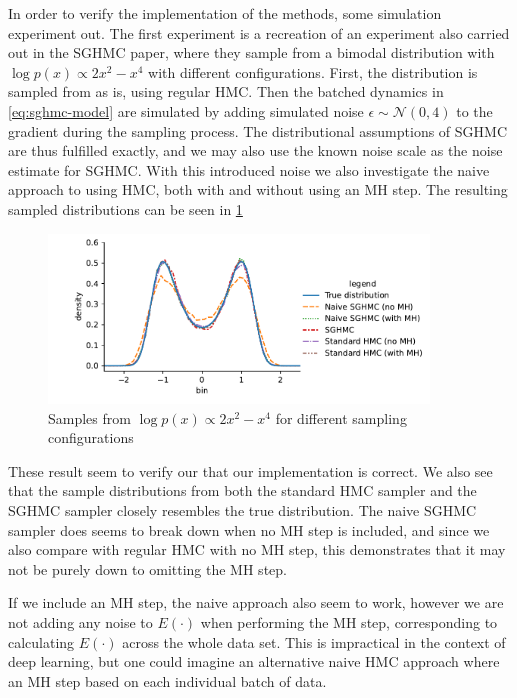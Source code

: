 In order to verify the implementation of the methods, some simulation experiment out. 
The first experiment is a recreation of an experiment also carried out in the SGHMC paper, where they sample from a bimodal distribution with $\log p(x) \propto 2 x^2 - x^ 4$ with different configurations. 
First, the distribution is sampled from as is, using regular HMC.
Then the batched dynamics in \cref{eq:sghmc-model} are simulated by adding simulated noise $\epsilon \sim \mathcal{N}(0, 4)$ to the gradient during the sampling process. 
The distributional assumptions of SGHMC are thus fulfilled exactly, and we may also use the known noise scale as the noise estimate for SGHMC. 
With this introduced noise we also investigate the naive approach to using HMC, both with and without using an MH step. 
The resulting sampled distributions can be seen in \cref{fig:synthetic}
\begin{figure}[htb]
    \centering
    \includegraphics[width=0.9\textwidth]{Figures/synthetic.pdf}
    \caption{Samples from $\log p(x) \propto 2 x^2 - x^ 4$ for different sampling configurations}
    \label{fig:synthetic}
\end{figure}
These result seem to verify our that our implementation is correct.
We also see that the sample distributions from both the standard HMC sampler and the SGHMC sampler closely resembles the true distribution. 
The naive SGHMC sampler does seems to break down when no MH step is included, and since we also compare with regular HMC with no MH step, this demonstrates that it may not be purely down to omitting the MH step. 

If we include an MH step, the naive approach also seem to work, however we are not adding any noise to $E(\cdot)$ when performing the MH step, corresponding to calculating $E(\cdot)$ across the whole data set. 
This is impractical in the context of deep learning, but one could imagine an alternative naive HMC approach where an MH step based on each individual batch of data. 

